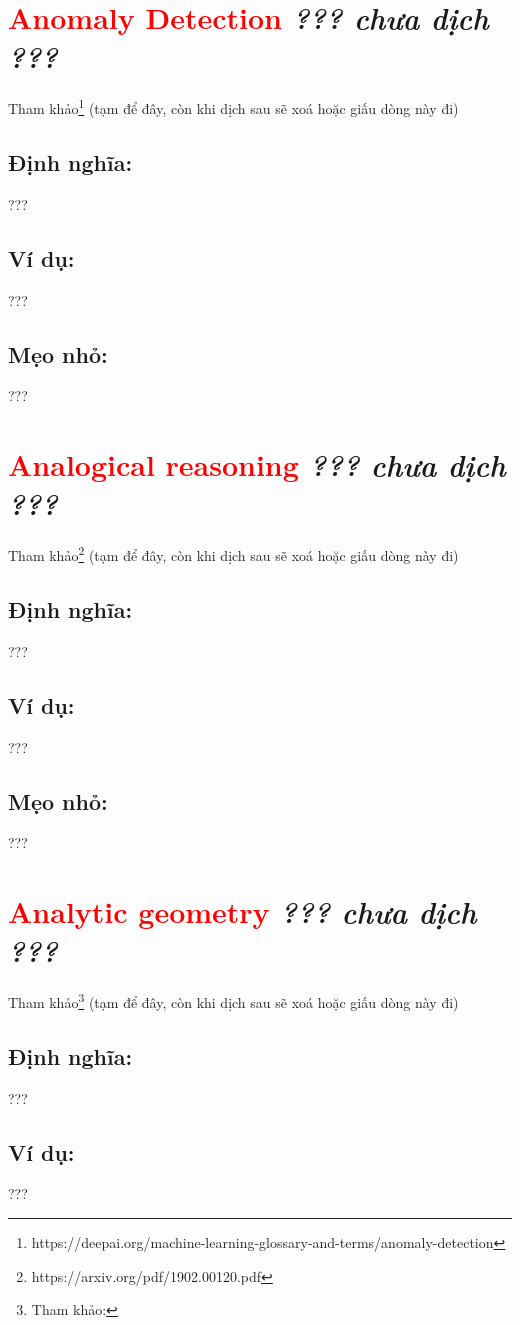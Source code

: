 \section*{\huge \textcolor{Red}{Anomaly Detection}  \small \textit{??? chưa dịch ???} }
Tham khảo\footnote{https://deepai.org/machine-learning-glossary-and-terms/anomaly-detection} (tạm để đây, còn khi dịch sau sẽ xoá hoặc giấu dòng này đi)
\subsection*{Định nghĩa:}
???
\subsection*{Ví dụ:}
???
\subsection*{Mẹo nhỏ:}
???
\section*{\huge \textcolor{Red}{Analogical reasoning}  \small \textit{??? chưa dịch ???} }
Tham khảo\footnote{https://arxiv.org/pdf/1902.00120.pdf} (tạm để đây, còn khi dịch sau sẽ xoá hoặc giấu dòng này đi)
\subsection*{Định nghĩa:}
???
\subsection*{Ví dụ:}
???
\subsection*{Mẹo nhỏ:}
???
\section*{\huge \textcolor{Red}{Analytic geometry}  \small \textit{??? chưa dịch ???} }
Tham khảo\footnote{Tham khảo:} (tạm để đây, còn khi dịch sau sẽ xoá hoặc giấu dòng này đi)
\subsection*{Định nghĩa:}
???
\subsection*{Ví dụ:}
???

